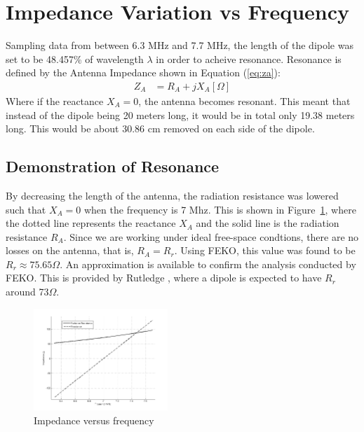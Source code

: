 \section{Impedance Variation vs Frequency}
Sampling data from between 6.3 MHz and 7.7 MHz, the length of the dipole was
set to be 48.457\% of wavelength $\lambda$ in order to acheive resonance.
Resonance is defined by the Antenna Impedance shown in Equation (\ref{eq:za}):
\begin{align}
  Z_A&=R_A+jX_A [\Omega]\label{eq:za}
\end{align}
Where if the reactance $X_A=0$, the antenna becomes resonant.
This meant that instead of the dipole being 20 meters long, it
would be in total only 19.38 meters long. This would be about 30.86 cm removed on each side of the
dipole.
\subsection{Demonstration of Resonance}
By decreasing the length of the antenna, the radiation resistance was lowered
such that $X_A=0$ when the frequency is 7 Mhz. This is shown in Figure~\ref{fig:impedance},
where the dotted line represents the reactance $X_A$ and the solid line is the
radiation resistance $R_A$. Since we are working under ideal free-space condtions,
there are no losses on the antenna, that is, $R_A=R_r$. Using FEKO, this value was
found to be $R_r \approx 75.65\Omega$. An approximation is available to confirm
the analysis conducted by FEKO. This is provided by Rutledge \cite{ER}, where a
dipole is expected to have $R_r$ around 73$\Omega$.

\begin{figure}[h!]
  \centering
  \includegraphics[width=0.45\textwidth]{./img/impf.png}
  \caption{Impedance versus frequency}
  \label{fig:impedance}
\end{figure}
